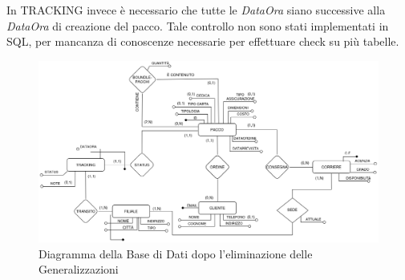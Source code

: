 In TRACKING invece è necessario che tutte le \textit{DataOra} siano successive alla \textit{DataOra} di creazione del pacco. Tale controllo non sono stati implementati in SQL, per mancanza di conoscenze necessarie per effettuare check su più tabelle.\\
\begin{figure}[H]
\centering
\includegraphics[width=1 \textwidth]{Resources/ML.png}
\caption{Diagramma della Base di Dati dopo l'eliminazione delle Generalizzazioni}
\label{ML}
\end{figure}

